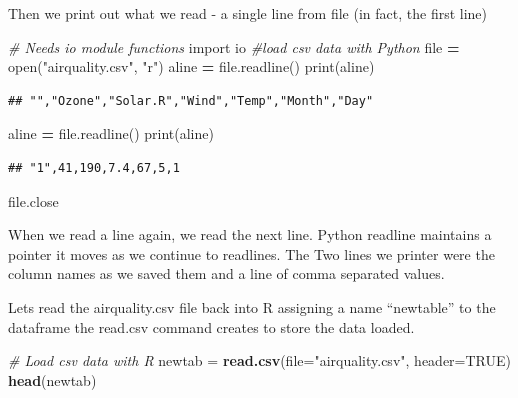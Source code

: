 \documentclass[]{book}
\newenvironment{Shaded}{\begin{snugshade}}{\end{snugshade}}
\newcommand{\KeywordTok}[1]{\textcolor[rgb]{0.13,0.29,0.53}{\textbf{#1}}}
\newcommand{\DataTypeTok}[1]{\textcolor[rgb]{0.13,0.29,0.53}{#1}}
\newcommand{\StringTok}[1]{\textcolor[rgb]{0.31,0.60,0.02}{#1}}
\newcommand{\ImportTok}[1]{#1}
\newcommand{\CommentTok}[1]{\textcolor[rgb]{0.56,0.35,0.01}{\textit{#1}}}
\newcommand{\OtherTok}[1]{\textcolor[rgb]{0.56,0.35,0.01}{#1}}
\newcommand{\OperatorTok}[1]{\textcolor[rgb]{0.81,0.36,0.00}{\textbf{#1}}}
\newcommand{\BuiltInTok}[1]{#1}
\newcommand{\NormalTok}[1]{#1}
\theoremstyle{definition}
\theoremstyle{definition}
\theoremstyle{definition}
\theoremstyle{remark}
\begin{document}
Then we print out what we read - a single line from file (in fact, the
first line)

\begin{Shaded}
\begin{Highlighting}[]
\CommentTok{# Needs io module functions}
\ImportTok{import}\NormalTok{ io}
\CommentTok{#load csv data with Python }
\BuiltInTok{file} \OperatorTok{=} \BuiltInTok{open}\NormalTok{(}\StringTok{"airquality.csv"}\NormalTok{, }\StringTok{"r"}\NormalTok{)}
\NormalTok{aline }\OperatorTok{=} \BuiltInTok{file}\NormalTok{.readline()}
\BuiltInTok{print}\NormalTok{(aline)}
\end{Highlighting}
\end{Shaded}

\begin{verbatim}
## "","Ozone","Solar.R","Wind","Temp","Month","Day"
\end{verbatim}

\begin{Shaded}
\begin{Highlighting}[]
\NormalTok{aline }\OperatorTok{=} \BuiltInTok{file}\NormalTok{.readline()}
\BuiltInTok{print}\NormalTok{(aline)}
\end{Highlighting}
\end{Shaded}

\begin{verbatim}
## "1",41,190,7.4,67,5,1
\end{verbatim}

\begin{Shaded}
\begin{Highlighting}[]
\BuiltInTok{file}\NormalTok{.close}
\end{Highlighting}
\end{Shaded}

When we read a line again, we read the next line. Python readline
maintains a pointer it moves as we continue to readlines. The Two lines
we printer were the column names as we saved them and a line of comma
separated values.

Lets read the airquality.csv file back into R assigning a name
``newtable'' to the dataframe the read.csv  command
creates to store the data loaded.

\begin{Shaded}
\begin{Highlighting}[]
\CommentTok{# Load csv data with R}
\NormalTok{newtab =}\StringTok{ }\KeywordTok{read.csv}\NormalTok{(}\DataTypeTok{file=}\StringTok{"airquality.csv"}\NormalTok{, }\DataTypeTok{header=}\OtherTok{TRUE}\NormalTok{)}
\KeywordTok{head}\NormalTok{(newtab)}
\end{Highlighting}
\end{Shaded}
\end{document}
